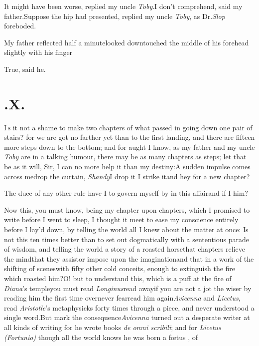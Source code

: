 \documentclass{article}
\begin{document}
It might have been worse, replied my uncle
\textit{Toby}.\tsk I don’t comprehend, said my
father.\tsk Suppose the hip had presented, replied my
uncle \textit{Toby}, as Dr.\@ \textit{Slop} foreboded.

My father reflected half a minute\tsk looked down\tsk touched the middle of his
forehead slightly with his finger\tsh

\tsk True, said he.

\parskip
{}
\newpage
\null\smallskip
\section{.\enspace X.}

\lettrine{I}{\,s} it not a shame to make two chapters of what passed in going down one
pair of stairs? for we are got no farther yet than to the first landing, and there
are fifteen more steps down to the bottom; and for aught I know, as my father and my
uncle \textit{Toby} are in a talking humour, there may be as
many chapters as steps;\tsk
let that be as it will, Sir, I can no more help it than my destiny:\tsk A sudden
impulse comes across me\tsh drop the curtain,
\textit{Shandy}\tsk I drop it\tsh 
{}\break
\tsk I strike it\tsk and hey for a new chapter?

The duce of any other rule have I to govern myself by in
this affair\tsk and if I
him?

Now this, you must know, being my chapter upon chapters,
which I promised to write before I went to sleep, I thought
it meet to ease my conscience entirely before I lay’d down,
by telling the world all I knew about the matter at once: Is
not this ten times better than to set out dogmatically with
a sententious parade of wisdom, and telling the world a
story of a roasted horse\tsk that chapters relieve the
mind\tsk that they assist\tsk or impose upon the
imagination\tsk and that in a work of\break
{}
the shifting of scenes\tsh with
fifty other cold conceits, enough to extinguish the fire
which roasted him?\tsk O! but to understand this, which is a
puff at the fire of \textit{Diana}’s temple\tsk you must
read \textit{Longinus}\tsk read away\tsk if you are not a
jot the wiser by reading him the first time over\break\tsk never
fear\tsk read him again\tsk \textit{Avicenna} and
\textit{Licetus}, read \textit{Aristotle}’s metaphysicks
forty times through a piece, and never understood a single
word.\tsk But mark the consequence\tsk \textit{Avicenna}
turned out a desperate writer at all kinds of writing\tsk
for he wrote books \textit{de omni scribili}; and for
\textit{Licetus (Fortunio)} though all the world knows he
was born a fœtus \fnast, of\break
{}
\end{document}
